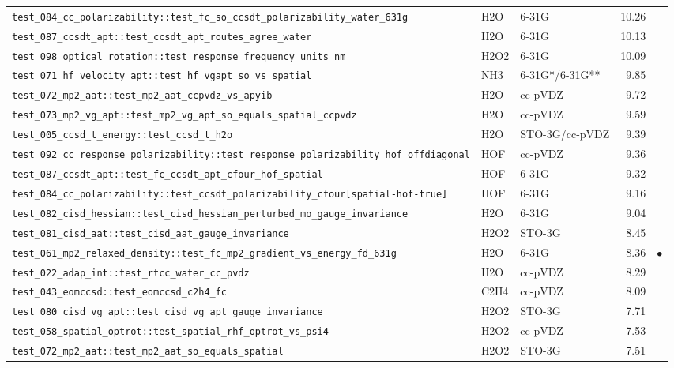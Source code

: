 \documentclass[10pt]{article}
\begin{document}
\begin{longtable}{l l l r c}
\texttt{test\_084\_cc\_polarizability::test\_fc\_so\_ccsdt\_polarizability\_water\_631g} & H2O & 6-31G & 10.26 &  \\
\texttt{test\_087\_ccsdt\_apt::test\_ccsdt\_apt\_routes\_agree\_water} & H2O & 6-31G & 10.13 &  \\
\texttt{test\_098\_optical\_rotation::test\_response\_frequency\_units\_nm} & H2O2 & 6-31G & 10.09 &  \\
\texttt{test\_071\_hf\_velocity\_apt::test\_hf\_vgapt\_so\_vs\_spatial} & NH3 & 6-31G{*}/6-31G{*}{*} & 9.85 &  \\
\texttt{test\_072\_mp2\_aat::test\_mp2\_aat\_ccpvdz\_vs\_apyib} & H2O & cc-pVDZ & 9.72 &  \\
\texttt{test\_073\_mp2\_vg\_apt::test\_mp2\_vg\_apt\_so\_equals\_spatial\_ccpvdz} & H2O & cc-pVDZ & 9.59 &  \\
\texttt{test\_005\_ccsd\_t\_energy::test\_ccsd\_t\_h2o} & H2O & STO-3G/cc-pVDZ & 9.39 &  \\
\texttt{test\_092\_cc\_response\_polarizability::test\_response\_polarizability\_hof\_offdiagonal} & HOF & cc-pVDZ & 9.36 &  \\
\texttt{test\_087\_ccsdt\_apt::test\_fc\_ccsdt\_apt\_cfour\_hof\_spatial} & HOF & 6-31G & 9.32 &  \\
\texttt{test\_084\_cc\_polarizability::test\_ccsdt\_polarizability\_cfour[spatial-hof-true]} & HOF & 6-31G & 9.16 &  \\
\texttt{test\_082\_cisd\_hessian::test\_cisd\_hessian\_perturbed\_mo\_gauge\_invariance} & H2O & 6-31G & 9.04 &  \\
\texttt{test\_081\_cisd\_aat::test\_cisd\_aat\_gauge\_invariance} & H2O2 & STO-3G & 8.45 &  \\
\texttt{test\_061\_mp2\_relaxed\_density::test\_fc\_mp2\_gradient\_vs\_energy\_fd\_631g} & H2O & 6-31G & 8.36 & $\bullet$ \\
\texttt{test\_022\_adap\_int::test\_rtcc\_water\_cc\_pvdz} & H2O & cc-pVDZ & 8.29 &  \\
\texttt{test\_043\_eomccsd::test\_eomccsd\_c2h4\_fc} & C2H4 & cc-pVDZ & 8.09 &  \\
\texttt{test\_080\_cisd\_vg\_apt::test\_cisd\_vg\_apt\_gauge\_invariance} & H2O2 & STO-3G & 7.71 &  \\
\texttt{test\_058\_spatial\_optrot::test\_spatial\_rhf\_optrot\_vs\_psi4} & H2O2 & cc-pVDZ & 7.53 &  \\
\texttt{test\_072\_mp2\_aat::test\_mp2\_aat\_so\_equals\_spatial} & H2O2 & STO-3G & 7.51 &  \\

\end{longtable}
\end{document}
